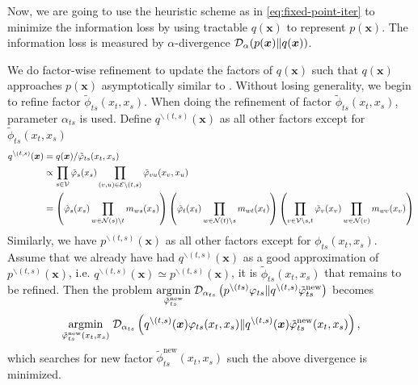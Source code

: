 \documentclass[conference,onecolumn]{IEEEtran}
\begin{document}
Now, we are going to use the heuristic scheme as in \autoref{eq:fixed-point-iter} to minimize the information loss by using tractable $q(\bm{x})$ to represent $p(\bm{x})$. The information loss is measured by $\alpha$-divergence $\mathcal{D}_{\alpha}(p(\bm{x}) \| q(\bm{x}))$.

We do factor-wise refinement to update the factors of $q(\bm{x})$ such that $q(\bm{x})$ approaches $p(\bm{x})$ asymptotically similar to \cite{divergence-measures-and-message-passing,Minka:2001:EPA:647235.720257}. Without losing generality, we begin to refine factor $\tilde{\phi}_{ts}(x_t, x_s)$. When doing the refinement of factor $\tilde{\phi}_{ts}(x_t, x_s)$, parameter $\alpha_{ts}$ is used. Define $q^{\backslash (t,s)}(\bm{x})$ as all other factors except for $\tilde{\phi}_{ts}(x_t, x_s)$
\begin{align}
  q^{\backslash (t,s)}(\bm{x})
  &= q(\bm{x})/\tilde{\varphi}_{ts}(x_t,
    x_s) \nonumber \\
  &\propto \prod_{{s\in \mathcal{V}}} \tilde{\varphi}_s(x_s) \prod_{(v,u) \in
    \mathcal{E}\backslash (t,s)}
    \tilde{\varphi}_{vu}(x_v, x_u) \nonumber \\
  &= \left(
    \tilde{\varphi}_s(x_s) \prod_{w\in \mathcal{N}(s) \backslash t}m_{ws}(x_s)
    \right)
    \left(
    \tilde{\varphi}_t(x_t) \prod_{w\in \mathcal{N}(t) \backslash s}m_{wt}(x_t)
    \right)
    \left(
    \prod_{v \in \mathcal{V} \backslash s,t}
    \tilde{\varphi}_v(x_v) \prod_{w\in \mathcal{N}(v)}m_{wv}(x_v)
    \right)\nonumber \\
\end{align}
Similarly, we have $p^{\backslash (t,s)}(\bm{x})$ as all other factors except for ${\phi}_{ts}(x_t, x_s)$. Assume that we already have had $q^{\backslash (t,s)}(\bm{x})$ as a good approximation of $p^{\backslash (t,s)}(\bm{x})$, i.e. $q^{\backslash (t,s)}(\bm{x}) \simeq p^{\backslash (t,s)}(\bm{x})$, it is $\tilde{\phi}_{ts}(x_t, x_s)$ that remains to be refined. 
Then the problem $\underset{\tilde{\varphi}_{ts}^{\mathrm{new}}}{\operatorname{argmin}}\; \mathcal{D}_{\alpha_{ts}}\left(  p^{\backslash (ts)}\varphi_{ts}\|q^{\backslash (t,s)}\tilde{\varphi}_{ts}^{\mathrm{new}}\right)$ becomes \vspace{-0.3cm}
\begin{equation}\label{eq:alpha-minimize-factor}
  \underset{\tilde{\varphi}_{ts}^{\mathrm{new}}(x_t, x_s)}{\operatorname{argmin}}\;
  \mathcal{D}_{\alpha_{ts}}\left( q^{\backslash (t,s)}(\bm{x}){\varphi}_{ts}(x_t, x_s)
    \|q^{\backslash (t,s)}(\bm{x})\tilde{\varphi}_{ts}^{\mathrm{new}}(x_t, x_s) \right),
\end{equation}
which searches for new factor $\tilde{\phi}_{ts}^{\mathrm{new}}(x_t, x_s)$ such the above divergence is minimized.
\end{document}
